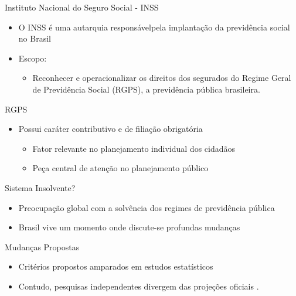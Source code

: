 \begin{frame}
  \begin{block}{Instituto Nacional do Seguro Social - INSS}
    \begin{itemize}
      \item O INSS é uma autarquia responsávelpela implantação da previdência
      social no Brasil
      \item Escopo:
      \begin{itemize}
        \item Reconhecer e operacionalizar os direitos dos segurados do Regime
        Geral de Previdência Social (RGPS), a previdência pública brasileira.
      \end{itemize}
    \end{itemize}
  \end{block}
  \begin{block}{RGPS}
    \begin{itemize}
      \item Possui caráter contributivo e de filiação \alert{obrigatória}
      \begin{itemize}
        \item Fator relevante no planejamento individual dos cidadãos
        \item Peça central de atenção no planejamento público
      \end{itemize}
    \end{itemize}
  \end{block}
\end{frame}

\begin{frame}
  \begin{block}{Sistema Insolvente?}
    \begin{itemize}
      \item Preocupação global com a solvência dos regimes de previdência
      pública
      \item Brasil vive um momento onde discute-se \alert{profundas mudanças}
    \end{itemize}
  \end{block}
  \pause
  \begin{block}{Mudanças Propostas}
    \begin{itemize}
      \item Critérios propostos amparados em estudos estatísticos
      \item Contudo, pesquisas independentes divergem das projeções oficiais
      \cite{reformarparaexcluir}.
    \end{itemize}
  \end{block}
\end{frame}

